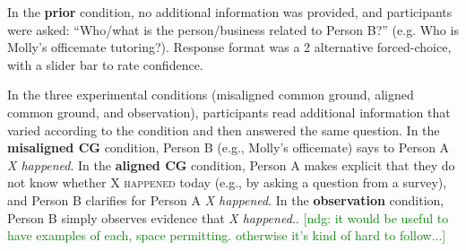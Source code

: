 \documentclass[10pt,letterpaper]{article}
\newcommand{\ndg}[1]{\textcolor{Green}{[ndg: #1]}}
\begin{document}
In the \textbf{prior} condition, no additional information was provided, and participants were asked: ``Who/what is the person/business related to Person B?'' (e.g. Who is Molly's officemate tutoring?).  Response format was a 2 alternative forced-choice, with a slider bar to rate confidence.

In the three experimental conditions (misaligned common ground, aligned common ground, and observation), participants read additional information that varied according to the condition and then answered the same question.
In the \textbf{misaligned CG} condition,  Person B (e.g., Molly's officemate) says to Person A \emph{X happened}. 
In the \textbf{aligned CG} condition, Person A makes explicit that they do not know whether \textsc{X happened} today (e.g., by asking a question from a survey), and Person B clarifies for Person A \emph{X happened}.
In the \textbf{observation} condition, Person B simply observes evidence that \emph{X happened.}.
\ndg{it would be useful to have examples of each, space permitting. otherwise it's kind of hard to follow...}
\end{document}
